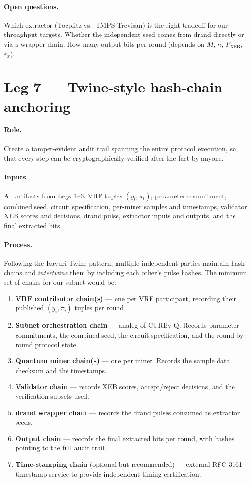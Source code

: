 \documentclass[11pt]{article}
\begin{document}
\paragraph{Open questions.} Which extractor (Toeplitz vs.\ TMPS Trevisan) is the right tradeoff for our throughput targets. Whether the independent seed comes from drand directly or via a wrapper chain. How many output bits per round (depends on $M$, $n$, $F_{\text{XEB}}$, $\varepsilon_x$).

\section{Leg 7 --- Twine-style hash-chain anchoring}

\paragraph{Role.} Create a tamper-evident audit trail spanning the entire protocol execution, so that every step can be cryptographically verified after the fact by anyone.

\paragraph{Inputs.} All artifacts from Legs 1--6: VRF tuples $(y_i, \pi_i)$, parameter commitment, combined seed, circuit specification, per-miner samples and timestamps, validator XEB scores and decisions, drand pulse, extractor inputs and outputs, and the final extracted bits.

\paragraph{Process.} Following the Kavuri Twine pattern, multiple independent parties maintain hash chains and \emph{intertwine} them by including each other's pulse hashes. The minimum set of chains for our subnet would be:

\begin{enumerate}
    \item \textbf{VRF contributor chain(s)} --- one per VRF participant, recording their published $(y_i, \pi_i)$ tuples per round.
    \item \textbf{Subnet orchestration chain} --- analog of CURBy-Q. Records parameter commitments, the combined seed, the circuit specification, and the round-by-round protocol state.
    \item \textbf{Quantum miner chain(s)} --- one per miner. Records the sample data checksum and the timestamps.
    \item \textbf{Validator chain} --- records XEB scores, accept/reject decisions, and the verification subsets used.
    \item \textbf{drand wrapper chain} --- records the drand pulses consumed as extractor seeds.
    \item \textbf{Output chain} --- records the final extracted bits per round, with hashes pointing to the full audit trail.
    \item \textbf{Time-stamping chain} (optional but recommended) --- external RFC 3161 timestamp service to provide independent timing certification.
\end{enumerate}
\end{document}
